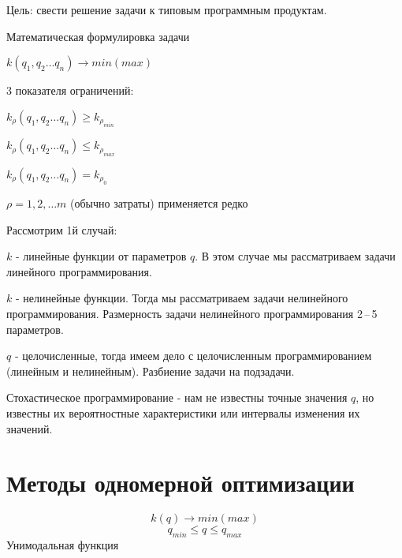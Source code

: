 \documentclass[12pt,a5paper]{scrbook}
\begin{document}
  Цель: свести решение задачи к типовым программным продуктам.\par
  Математическая формулировка задачи\par
  \(
  k(q_1, q_2\ldots q_n)\to min (max)
  \)
  \par
  3 показателя ограничений:\par
  \(
  k_{\rho}(q_1, q_2\ldots q_n)\geq k_{\rho_{min}}
  \)\par
  \(
  k_{\rho}(q_1, q_2\ldots q_n)\leq k_{\rho_{max}}
  \)\par
  \(
  k_{\rho}(q_1, q_2\ldots q_n) = k_{\rho_{0}}
  \)\par
  $\rho = 1, 2, \ldots m$ (обычно затраты) применяется редко\par
  Рассмотрим 1й случай:\par
  $k$ - линейные функции от параметров $q$. В этом случае мы рассматриваем задачи линейного программирования.\par
  $k$ - нелинейные функции. Тогда мы рассматриваем задачи нелинейного программирования. Размерность задачи нелинейного программирования 2\,--\,5 параметров.\par
  $q$ - целочисленные, тогда имеем дело с целочисленным программированием (линейным и нелинейным). Разбиение задачи на подзадачи.\par
  Стохастическое программирование - нам не известны точные значения $q$, но известны их вероятностные характеристики или интервалы изменения их значений.\par
  \chapter{Методы одномерной оптимизации}
  \pagestyle{headings}
  $$k(q)\to min(max)$$
  $$q_{min}\leq q \leq q_{max}$$
  Унимодальная функция
  \begin{figure}[h]
  \end{figure}
\end{document}
